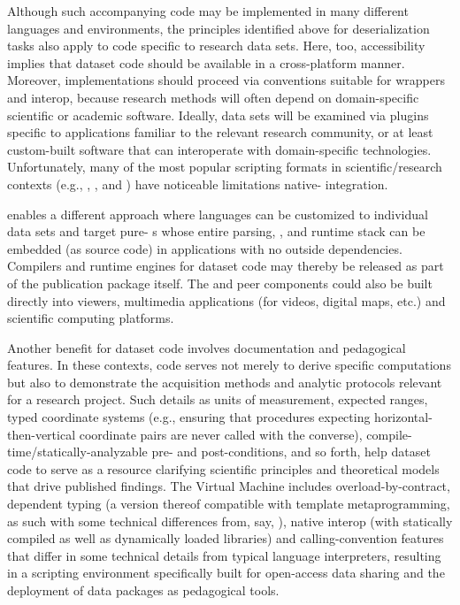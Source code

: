 \documentclass[11pt]{article}
\begin{document}
{{\begin{description}
\pseudoIndent{} Although such accompanying code may be implemented 
in many different languages and environments, the \VM{} principles 
identified above for deserialization tasks also apply 
to code specific to research data sets.  Here, too, accessibility 
implies that dataset code should be available in a cross-platform 
manner.  Moreover, implementations should proceed via 
conventions suitable for \GUI{} wrappers and interop, because 
research methods will often depend on domain-specific 
scientific or academic software.  Ideally, data sets will 
be examined via plugins specific to applications familiar to 
the relevant research community, or at least custom-built 
software that can interoperate with domain-specific technologies.  
Unfortunately, many of the most popular scripting formats 
in scientific/research contexts (e.g., \Python{}, \JavaScript{}, and \R{}) 
have noticeable limitations \visavis{} native-\GUI{} integration.  

\pseudoIndent{} \lPacTk{} enables a different approach where 
languages can be customized to individual data sets and target 
pure-\Cpp{} \VM{}s whose entire parsing, \IR{}, and runtime stack 
can be embedded (as source code) in \Cpp{} \GUI{} applications with no outside 
dependencies.  Compilers and runtime engines for dataset code may 
thereby be released as part of the publication package itself.  
The \VM{} and peer components could also be built directly 
into \PDF{} viewers, multimedia applications (for videos, digital 
maps, etc.) and scientific computing platforms.

\pseudoIndent{} Another \PacTk{} benefit for dataset code involves 
documentation and pedagogical features.  In these contexts, code 
serves not merely to derive specific computations but also 
to demonstrate the acquisition methods and analytic protocols relevant 
for a research project.  Such details as units of measurement, 
expected ranges, typed coordinate systems (e.g., ensuring that 
procedures expecting horizontal-then-vertical coordinate 
pairs are never called with the converse), 
compile-time/statically-analyzable pre- and post-conditions, and so forth, 
help dataset code to serve as a resource clarifying scientific 
principles and theoretical models that drive published findings.  
The \PacTk{} Virtual Machine includes overload-by-contract, 
dependent typing 
(a version thereof compatible with template metaprogramming, as such 
with some technical differences from, say, \Idris{}), native 
interop (with statically compiled as well as dynamically loaded libraries) 
and  calling-convention features that differ 
in some technical details from typical language interpreters, 
resulting in a scripting environment specifically built for 
open-access data sharing and the deployment of data packages 
as pedagogical tools.    



\end{description}}}
\end{document}
